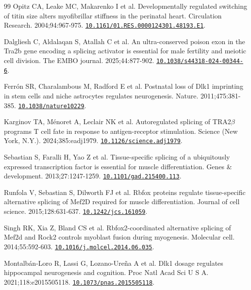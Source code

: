 \documentclass[11pt,a4paper]{article}
\begin{document}
\begin{thebibliography}{99}
Opitz CA, Leake MC, Makarenko I et al. Developmentally regulated switching of titin size alters myofibrillar stiffness in the perinatal heart. Circulation Research. 2004;94:967-975. \href{https://doi.org/10.1161/01.RES.0000124301.48193.E1}{\nolinkurl{10.1161/01.RES.0000124301.48193.E1}}.

Dalgliesh C, Aldalaqan S, Atallah C et al. An ultra-conserved poison exon in the Tra2b gene encoding a splicing activator is essential for male fertility and meiotic cell division. The EMBO journal. 2025;44:877-902. \href{https://doi.org/10.1038/s44318-024-00344-6}{\nolinkurl{10.1038/s44318-024-00344-6}}.

Ferrón SR, Charalambous M, Radford E et al. Postnatal loss of Dlk1 imprinting in stem cells and niche astrocytes regulates neurogenesis. Nature. 2011;475:381-385. \href{https://doi.org/10.1038/nature10229}{\nolinkurl{10.1038/nature10229}}.

Karginov TA, Ménoret A, Leclair NK et al. Autoregulated splicing of TRA2\(\beta\) programs T cell fate in response to antigen-receptor stimulation. Science (New York, N.Y.). 2024;385:eadj1979. \href{https://doi.org/10.1126/science.adj1979}{\nolinkurl{10.1126/science.adj1979}}.

Sebastian S, Faralli H, Yao Z et al. Tissue-specific splicing of a ubiquitously expressed transcription factor is essential for muscle differentiation. Genes \& development. 2013;27:1247-1259. \href{https://doi.org/10.1101/gad.215400.113}{\nolinkurl{10.1101/gad.215400.113}}.

Runfola V, Sebastian S, Dilworth FJ et al. Rbfox proteins regulate tissue-specific alternative splicing of Mef2D required for muscle differentiation. Journal of cell science. 2015;128:631-637. \href{https://doi.org/10.1242/jcs.161059}{\nolinkurl{10.1242/jcs.161059}}.

Singh RK, Xia Z, Bland CS et al. Rbfox2-coordinated alternative splicing of Mef2d and Rock2 controls myoblast fusion during myogenesis. Molecular cell. 2014;55:592-603. \href{https://doi.org/10.1016/j.molcel.2014.06.035}{\nolinkurl{10.1016/j.molcel.2014.06.035}}.

Montalbán-Loro R, Lassi G, Lozano-Ureña A et al. Dlk1 dosage regulates hippocampal neurogenesis and cognition. Proc Natl Acad Sci U S A. 2021;118:e2015505118. \href{https://doi.org/10.1073/pnas.2015505118}{\nolinkurl{10.1073/pnas.2015505118}}.


\end{thebibliography}
\end{document}
